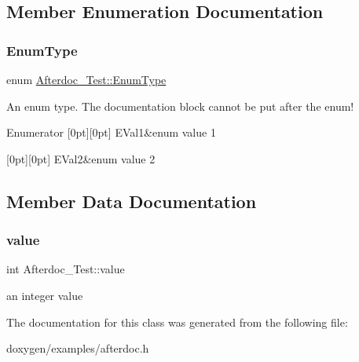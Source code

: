 \subsection{Member Enumeration Documentation}
\mbox{\label{class_afterdoc___test_adab0cd7ad3b4875e245ca8f6238a388a}} 
\subsubsection{\texorpdfstring{EnumType}{EnumType}}
{\footnotesize\ttfamily enum \mbox{\hyperlink{class_afterdoc___test_adab0cd7ad3b4875e245ca8f6238a388a}{Afterdoc\+\_\+\+Test\+::\+Enum\+Type}}}

An enum type. The documentation block cannot be put after the enum! \begin{DoxyEnumFields}{Enumerator}
[0pt][0pt]{}\mbox{\label{class_afterdoc___test_adab0cd7ad3b4875e245ca8f6238a388aae054276790e35692ad0abe10c5b75da4}} 
E\+Val1&enum value 1 \\
\hline

[0pt][0pt]{}\mbox{\label{class_afterdoc___test_adab0cd7ad3b4875e245ca8f6238a388aac849f37624d8d2d68ca72c4a8df9cf99}} 
E\+Val2&enum value 2 \\
\hline

\end{DoxyEnumFields}


\subsection{Member Data Documentation}
\mbox{\label{class_afterdoc___test_a9287a08830e5cdfd9c732bb7932694a0}} 
\subsubsection{\texorpdfstring{value}{value}}
{\footnotesize\ttfamily int Afterdoc\+\_\+\+Test\+::value\hspace{0.3cm}{\ttfamily [protected]}}

an integer value 

The documentation for this class was generated from the following file\+:\begin{DoxyCompactItemize}
\item 
doxygen/examples/afterdoc.\+h\end{DoxyCompactItemize}
